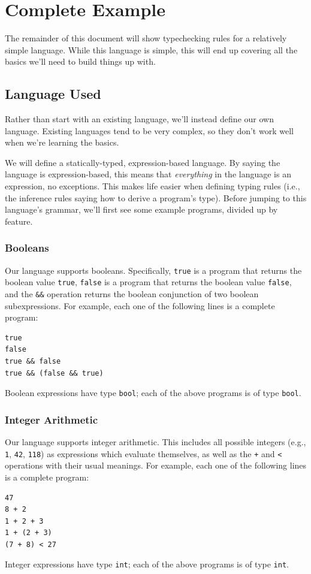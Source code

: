 \section{Complete Example}
The remainder of this document will show typechecking rules for a relatively simple language.
While this language is simple, this will end up covering all the basics we'll need to build things up with.

\subsection{Language Used}
Rather than start with an existing language, we'll instead define our own language.
Existing languages tend to be very complex, so they don't work well when we're learning the basics.

We will define a statically-typed, expression-based language.
By saying the language is expression-based, this means that \emph{everything} in the language is an expression, no exceptions.
This makes life easier when defining typing rules (i.e., the inference rules saying how to derive a program's type).
Before jumping to this language's grammar, we'll first see some example programs, divided up by feature.

\subsubsection{Booleans}
Our language supports booleans.
Specifically, \texttt{true} is a program that returns the boolean value \texttt{true}, \texttt{false} is a program that returns the boolean value \texttt{false}, and the \texttt{\&\&} operation returns the boolean conjunction of two boolean subexpressions.
For example, each one of the following lines is a complete program:
\begin{verbatim}
true
false
true && false
true && (false && true)
\end{verbatim}
Boolean expressions have type \texttt{bool}; each of the above programs is of type \texttt{bool}.

\subsubsection{Integer Arithmetic}
Our language supports integer arithmetic.
This includes all possible integers (e.g., \texttt{1}, \texttt{42}, \texttt{118}) as expressions which evaluate themselves, as well as the \texttt{+} and \texttt{<} operations with their usual meanings.
For example, each one of the following lines is a complete program:
\begin{verbatim}
47
8 + 2
1 + 2 + 3
1 + (2 + 3)
(7 + 8) < 27
\end{verbatim}
Integer expressions have type \texttt{int}; each of the above programs is of type \texttt{int}.

